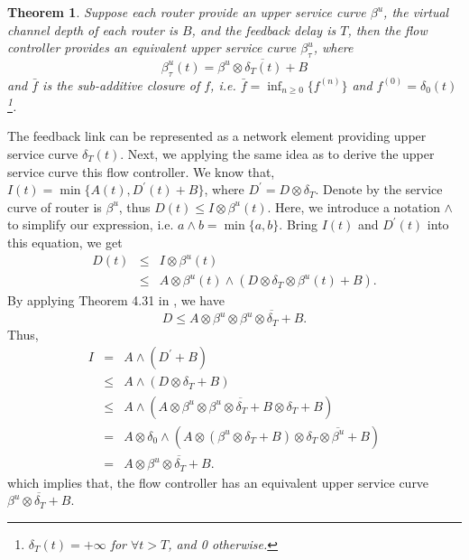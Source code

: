 \documentclass[10pt,journal]{IEEEtran}
\newtheorem{theorem}{Theorem}
\begin{document}
\begin{theorem}\label{credit}
Suppose each router provide an upper service curve $\beta^u$, the virtual channel depth of each router is $B$, and the feedback delay is $T$, then the flow controller provides an equivalent upper service curve $\beta^{u}_\tau$, where $$\beta^{u}_\tau(t)=\overline{\beta^u\otimes\delta_T(t)+B}$$
and $\bar{f}$ is the sub-additive closure of $f$, i.e. $\bar{f}=\inf_{n\geq 0}\{f^{(n)}\}$ and $f^{(0)}=\delta_0(t)$\footnote{$\delta_T(t)=+\infty$ for $\forall t>T$, and 0 otherwise.}.
\end{theorem}
\begin{IEEEproof}
The feedback link can be represented as a network element providing upper service curve $\delta_T(t)$. Next, we applying the same idea as \cite{QLDD09FC} to derive the upper service curve this flow controller. We know that, $I(t)=\min\{A(t),D^\prime(t)+B\}$, where $D^\prime=D\otimes\delta_T$. Denote by the service curve of router is $\beta^u$, thus $D(t)\leq I\otimes \beta^u(t)$. Here, we introduce a notation $\wedge$ to simplify our expression, i.e. $a\wedge b=\min\{a,b\}$. Bring $I(t)$ and $D^\prime(t)$ into this equation, we get
\begin{eqnarray*}
D(t)&\leq& I\otimes \beta^u(t)\\
&\leq& A\otimes \beta^u(t)\wedge(D\otimes\delta_T\otimes \beta^u(t)+B).
\end{eqnarray*}
By applying Theorem 4.31 in \cite{Boudec2001Network}, we have
$$D\leq A\otimes \beta^u\otimes\overline{\beta^u\otimes\delta_T+B}.$$
Thus,
\begin{eqnarray*}
  I&=& A\wedge(D^\prime+B)\\
  &\leq& A\wedge(D\otimes\delta_T+B)\\
  &\leq& A\wedge(A\otimes \beta^u\otimes\overline{\beta^u\otimes\delta_T+B}\otimes\delta_T+B)\\
  &=&A\otimes \delta_0\wedge(A\otimes (\beta^u\otimes\delta_T+B)\otimes\overline{\delta_T\otimes\beta^u+B})\\
  &=& A\otimes\overline{\beta^u\otimes\delta_T+B}.
\end{eqnarray*}
which implies that, the flow controller has an equivalent upper service curve $\overline{\beta^u\otimes\delta_T+B}$.
\end{IEEEproof}
\end{document}

